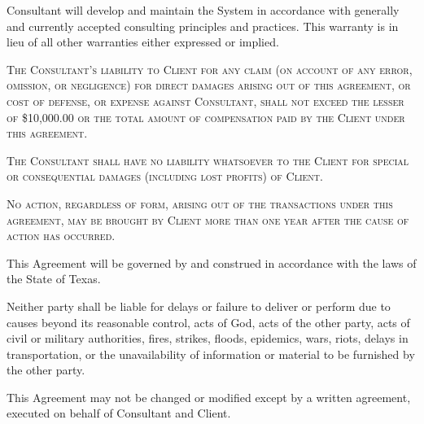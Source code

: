 \documentclass{tccontract}
\begin{document}
\begin{body}

Consultant will develop and maintain the System in accordance with
generally and currently accepted consulting principles and
practices. This warranty is in lieu of all other warranties either
expressed or implied.

\textsc{ The Consultant's liability to Client for any claim (on
  account of any error, omission, or negligence) for direct damages
  arising out of this agreement, or cost of defense, or expense
  against Consultant, shall not exceed the lesser of \$10,000.00 or
  the total amount of compensation paid by the Client under this
  agreement.}
  
\textsc{The Consultant shall have no liability whatsoever to the Client
for special or consequential damages (including lost profits) of Client.}
  
\textsc{No action, regardless of form, arising out of the transactions under
  this agreement, may be brought by Client more than one year after
  the cause of action has occurred.}

This Agreement will be governed by and construed in
accordance with the laws of the State of Texas.

Neither party shall be liable for delays or failure to deliver or
perform due to causes beyond its reasonable control, acts of God, acts
of the other party, acts of civil or military authorities, fires,
strikes, floods, epidemics, wars, riots, delays in transportation, or
the unavailability of information or material to be furnished by the
other party.

This Agreement may not be changed or modified except by a written
agreement, executed on behalf of Consultant and Client.


\end{body}
\end{document}
